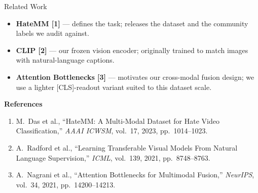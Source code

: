 \begin{minipage}[t]{0.465\textwidth}
  \begin{pbox}{Related Work}
    \begin{itemize}[leftmargin=7mm, itemsep=3mm]
      \item \textbf{HateMM [1]} --- defines the task; releases the dataset
            and the community labels we audit against.
      \item \textbf{CLIP [2]} --- our frozen vision encoder; originally
            trained to match images with natural-language captions.
      \item \textbf{Attention Bottlenecks [3]} --- motivates our
            cross-modal fusion design; we use a lighter
            [CLS]-readout variant suited to this dataset scale.
    \end{itemize}
  \end{pbox}

  \vspace{5mm}

  \noindent{\color{epflred}\rule{\linewidth}{1pt}}
  \vspace{3mm}

  {\LARGE\bfseries\textcolor{epflred}{References}}
  \vspace{3mm}

  \begin{enumerate}[leftmargin=7mm, itemsep=3mm, font=\large]
    \item M.\ Das et al., ``HateMM: A Multi-Modal Dataset for Hate
          Video Classification,'' \emph{AAAI ICWSM}, vol.~17, 2023,
          pp.~1014--1023.
    \item A.\ Radford et al., ``Learning Transferable Visual Models
          From Natural Language Supervision,'' \emph{ICML}, vol.~139,
          2021, pp.~8748--8763.
    \item A.\ Nagrani et al., ``Attention Bottlenecks for Multimodal
          Fusion,'' \emph{NeurIPS}, vol.~34, 2021, pp.~14200--14213.
  \end{enumerate}

\end{minipage}%
\hfill
